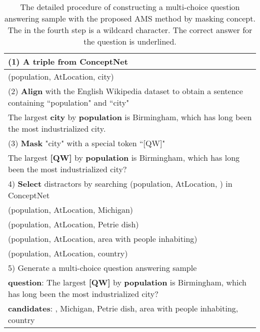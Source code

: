 \documentclass[11pt,a4paper]{article}
\begin{document}
\begin{table}[t]
	\small
	\begin{center}
		\begin{tabular}{p{7.0cm}}
			\toprule
			(1) A triple from ConceptNet \\
			\midrule
			(population, AtLocation, city) \\
			\midrule
			(2) \textbf{Align} with the English Wikipedia dataset to obtain a sentence containing ``population" and ``city" \\
			\midrule
			The largest \textbf{city} by \textbf{population} is Birmingham, which has long been the most industrialized city. \\
			\midrule
			(3) \textbf{Mask} "city" with a special token ``[QW]" \\
			\midrule
			The largest \textbf{[QW]} by \textbf{population} is Birmingham, which has long been the most industrialized city? \\
			\midrule
			4) \textbf{Select} distractors by searching (population, AtLocation, ) in ConceptNet \\
			\midrule
			(population, AtLocation, Michigan) \\
			(population, AtLocation, Petrie dish) \\
			(population, AtLocation, area with people inhabiting) \\
			(population, AtLocation, country) \\
			\midrule
			5) Generate a multi-choice question answering sample \\
			\midrule
			\textbf{question}: The largest \textbf{[QW]} by \textbf{population} is Birmingham, which has long been the most industrialized city? \\
			\textbf{candidates}: , Michigan, Petrie dish, area with people inhabiting, country \\
			\bottomrule
		\end{tabular}
	\end{center}
	\caption{
		The detailed procedure of constructing a multi-choice question answering sample with the proposed AMS method by masking concept.
		The  in the fourth step is a wildcard character.
		The correct answer for the question is underlined.}
	\label{data_construction}
\end{table}
\end{document}
